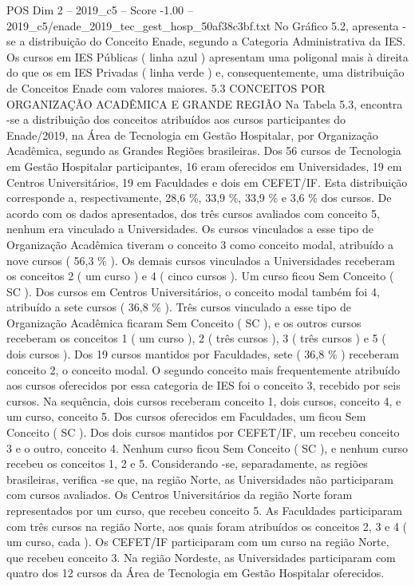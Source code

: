 \begin{textsample}{POS Dim 2 – 2019\_c5 – Score -1.00 – 2019\_c5/enade\_2019\_tec\_gest\_hosp\_50af38c3bf.txt}
No Gráfico 5.2, apresenta -se a distribuição do Conceito Enade, segundo a Categoria Administrativa da IES.
Os cursos em IES Públicas ( linha azul ) apresentam uma poligonal mais à direita do que os em IES Privadas ( linha verde ) e, consequentemente, uma distribuição de Conceitos Enade com valores maiores. 5.3 CONCEITOS POR ORGANIZAÇÃO ACADÊMICA E GRANDE REGIÃO Na Tabela 5.3, encontra -se a distribuição dos conceitos atribuídos aos cursos participantes do Enade/2019, na Área de Tecnologia em Gestão Hospitalar, por Organização Acadêmica, segundo as Grandes Regiões brasileiras.
Dos 56 cursos de Tecnologia em Gestão Hospitalar participantes, 16 eram oferecidos em Universidades, 19 em Centros Universitários, 19 em Faculdades e dois em CEFET/IF.
Esta distribuição corresponde a, respectivamente, 28,6 \%, 33,9 \%, 33,9 \% e 3,6 \% dos cursos.
De acordo com os dados apresentados, dos três cursos avaliados com conceito 5, nenhum era vinculado a Universidades.
Os cursos vinculados a esse tipo de Organização Acadêmica tiveram o conceito 3 como conceito modal, atribuído a nove cursos ( 56,3 \% ).
Os demais cursos vinculados a Universidades receberam os conceitos 2 ( um curso ) e 4 ( cinco cursos ).
Um curso ficou Sem Conceito ( SC ).
Dos cursos em Centros Universitários, o conceito modal também foi 4, atribuído a sete cursos ( 36,8 \% ).
Três cursos vinculado a esse tipo de Organização Acadêmica ficaram Sem Conceito ( SC ), e os outros cursos receberam os conceitos 1 ( um curso ), 2 ( três cursos ), 3 ( três cursos ) e 5 ( dois cursos ).
Dos 19 cursos mantidos por Faculdades, sete ( 36,8 \% ) receberam conceito 2, o conceito modal.
O segundo conceito mais frequentemente atribuído aos cursos oferecidos por essa categoria de IES foi o conceito 3, recebido por seis cursos.
Na sequência, dois cursos receberam conceito 1, dois cursos, conceito 4, e um curso, conceito 5.
Dos cursos oferecidos em Faculdades, um ficou Sem Conceito ( SC ).
Dos dois cursos mantidos por CEFET/IF, um recebeu conceito 3 e o outro, conceito 4.
Nenhum curso ficou Sem Conceito ( SC ), e nenhum curso recebeu os conceitos 1, 2 e 5.
Considerando -se, separadamente, as regiões brasileiras, verifica -se que, na região Norte, as Universidades não participaram com cursos avaliados.
Os Centros Universitários da região Norte foram representados por um curso, que recebeu conceito 5.
As Faculdades participaram com três cursos na região Norte, aos quais foram atribuídos os conceitos 2, 3 e 4 ( um curso, cada ).
Os CEFET/IF participaram com um curso na região Norte, que recebeu conceito 3.
Na região Nordeste, as Universidades participaram com quatro dos 12 cursos da Área de Tecnologia em Gestão Hospitalar oferecidos.

\end{textsample}
